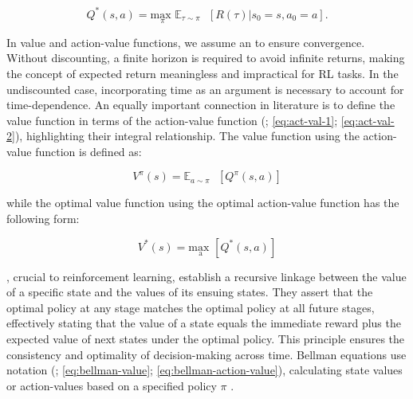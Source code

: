 \begin{equation}
    Q^{*}(s, a) = \underset{\pi}{\text{max }} \mathbb{E}_{\tau \sim \pi} \text{ }[R(\tau) | s_0 = s, a_0 = a].
    \label{eq:optimal-action-value}
\end{equation}

\noindent In value and action-value functions, we assume an  to ensure convergence. Without discounting, a finite horizon is required to avoid infinite returns, making the concept of expected return meaningless and impractical for RL tasks. In the undiscounted case, incorporating time as an argument is necessary to account for time-dependence. An equally important connection in literature is to define the value function in terms of the action-value function (\textcolor{deepblue}{\cite{Sutton1998}; \autoref{eq:act-val-1}; \autoref{eq:act-val-2}}), highlighting their integral relationship. The value function using the action-value function is defined as:

\begin{equation}
    V^{\pi}(s) = \mathbb{E}_{a \sim \pi} \text{ }[Q^{\pi}(s, a)]
    \label{eq:act-val-1}
\end{equation}

\noindent while the optimal value function using the optimal action-value function has the following form:

\begin{equation}
    V^{*}(s) = \underset{\text{a}}{\text{max }} [Q^{*}(s, a)]
    \label{eq:act-val-2}
\end{equation}

\noindent {}, crucial to reinforcement learning, establish a recursive linkage between the value of a specific state and the values of its ensuing states. They assert that the optimal policy at any stage matches the optimal policy at all future stages, effectively stating that the value of a state equals the immediate reward plus the expected value of next states under the optimal policy. This principle ensures the consistency and optimality of decision-making across time. Bellman equations use  notation (\textcolor{deepblue}{\cite{Sutton1998}; \autoref{eq:bellman-value}; \autoref{eq:bellman-action-value}}), calculating state values or action-values based on a specified policy $\pi$ \protect \footnotemark. 


